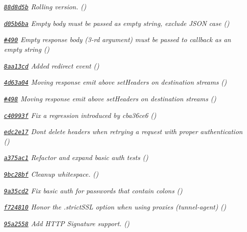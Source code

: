 \begin{DoxyItemize}
\item {\itshape \href{https://github.com/mikeal/request/commit/88d8d5bc80679b78a39cab8e6d8295728a0a150d}{\tt 88d8d5b} Rolling version. ()}
\item {\itshape \href{https://github.com/mikeal/request/commit/d05b6ba72702c2411b4627d4d89190a5f2aba562}{\tt d05b6ba} Empty body must be passed as empty string, exclude J\+S\+O\+N case ()}
\item {\itshape \href{https://github.com/mikeal/request/pull/490}{\tt \#490} Empty response body (3-\/rd argument) must be passed to callback as an empty string ()}
\item {\itshape \href{https://github.com/mikeal/request/commit/8aa13cd5b5e22b24466ef0e59fa8b5f1d0f0795a}{\tt 8aa13cd} Added redirect event ()}
\item {\itshape \href{https://github.com/mikeal/request/commit/4d63a042553c90718bf0b90652921b26c52dcb31}{\tt 4d63a04} Moving response emit above set\+Headers on destination streams ()}
\item {\itshape \href{https://github.com/mikeal/request/pull/498}{\tt \#498} Moving response emit above set\+Headers on destination streams ()}
\item {\itshape \href{https://github.com/mikeal/request/commit/c40993fc987b1a8a3cb08cd5699b2f1b2bd4b28b}{\tt c40993f} Fix a regression introduced by cba36ce6 ()}
\item {\itshape \href{https://github.com/mikeal/request/commit/edc2e17e8154239efa6bd2914435798c18882635}{\tt edc2e17} Don\textquotesingle{}t delete headers when retrying a request with proper authentication ()}
\item {\itshape \href{https://github.com/mikeal/request/commit/a375ac15460f4f3b679f4418d7fc467a5cc94499}{\tt a375ac1} Refactor and expand basic auth tests ()}
\item {\itshape \href{https://github.com/mikeal/request/commit/9bc28bf912fb0afdd14b36b0ccbafb185a32546a}{\tt 9bc28bf} Cleanup whitespace. ()}
\item {\itshape \href{https://github.com/mikeal/request/commit/9a35cd2248d9492b099c7ee46d68ca017b6a701c}{\tt 9a35cd2} Fix basic auth for passwords that contain colons ()}
\item {\itshape \href{https://github.com/mikeal/request/commit/f724810c7b9f82fa1423d0a4d19fcb5aaca98137}{\tt f724810} Honor the .strict\+S\+S\+L option when using proxies (tunnel-\/agent) ()}
\item {\itshape \href{https://github.com/mikeal/request/commit/95a25580375be1b9c39cc2e88a36a8387395bc13}{\tt 95a2558} Add H\+T\+T\+P Signature support. ()}

\end{DoxyItemize}
